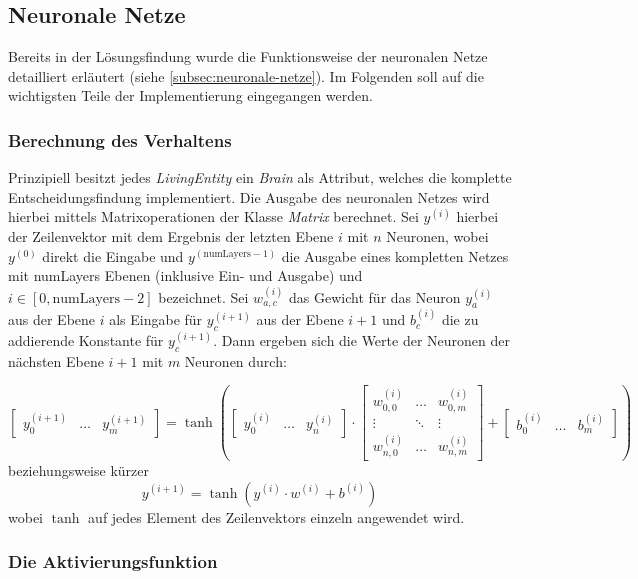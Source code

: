 \documentclass[course=erap]{aspdoc}
\begin{document}
\subsection{Neuronale Netze}
Bereits in der Lösungsfindung wurde die Funktionsweise der neuronalen Netze detailliert erläutert (siehe \ref{subsec:neuronale-netze}). Im Folgenden soll auf die wichtigsten Teile der Implementierung eingegangen werden.

\subsubsection{Berechnung des Verhaltens}

Prinzipiell besitzt jedes \emph{LivingEntity} ein \emph{Brain} als Attribut, welches die komplette Entscheidungsfindung implementiert. Die Ausgabe des neuronalen Netzes wird hierbei mittels Matrixoperationen der Klasse \emph{Matrix} berechnet. Sei $y^{(i)}$ hierbei der Zeilenvektor mit dem Ergebnis der letzten Ebene $i$ mit $n$ Neuronen, wobei $y^{(0)}$ direkt die Eingabe und $y^{(\text{numLayers}-1)}$ die Ausgabe eines kompletten Netzes mit numLayers Ebenen (inklusive Ein- und Ausgabe) und $i \in [0, \text{numLayers}-2]$ bezeichnet. Sei $w^{(i)}_{a,c}$ das Gewicht für das Neuron $y_a^{(i)}$ aus der Ebene $i$ als Eingabe für $y_c^{(i+1)}$ aus der Ebene $i+1$ und $b_c^{(i)}$ die zu addierende Konstante für $y_c^{(i+1)}$. Dann ergeben sich die Werte der Neuronen der nächsten Ebene $i+1$ mit $m$ Neuronen durch:

\[
\begin{bmatrix}
    y_0^{(i+1)} & \dots & y_m^{(i+1)}
\end{bmatrix} =
\tanh{ \left(
\begin{bmatrix}
    y_0^{(i)} & \dots & y_n^{(i)}
\end{bmatrix} \cdot
\begin{bmatrix}
    w_{0,0}^{(i)} & \dots & w_{0,m}^{(i)}\\
    \vdots  & \ddots & \vdots\\
    w_{n,0}^{(i)} & \dots & w_{n,m}^{(i)}
\end{bmatrix} +
\begin{bmatrix}
    b_0^{(i)} & \dots & b_m^{(i)}
\end{bmatrix}
\right)
}
\]
beziehungsweise kürzer
\[
y^{(i+1)} = \tanh \left( y^{(i)} \cdot w^{(i)} + b^{(i)}\right)
\]
wobei $\tanh$ auf jedes Element des Zeilenvektors einzeln angewendet wird.

\subsubsection{Die Aktivierungsfunktion}
\end{document}
